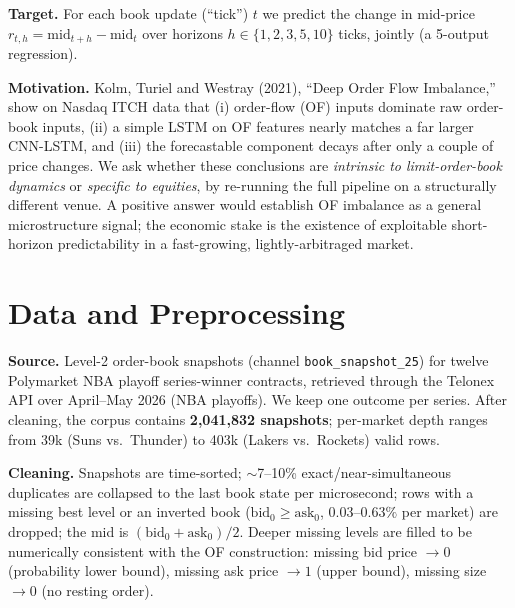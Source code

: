 \documentclass[10pt,twocolumn]{article}
\begin{document}
\textbf{Target.} For each book update (``tick'') $t$ we predict the change in
mid-price $r_{t,h}=\mathrm{mid}_{t+h}-\mathrm{mid}_t$ over horizons
$h\in\{1,2,3,5,10\}$ ticks, jointly (a 5-output regression).

\textbf{Motivation.} Kolm, Turiel and Westray (2021), ``Deep Order Flow
Imbalance,'' show on Nasdaq ITCH data that (i) order-flow (OF) inputs dominate raw
order-book inputs, (ii) a simple LSTM on OF features nearly matches a far larger
CNN-LSTM, and (iii) the forecastable component decays after only a couple of price
changes. We ask whether these conclusions are \emph{intrinsic to limit-order-book
dynamics} or \emph{specific to equities}, by re-running the full pipeline on a
structurally different venue. A positive answer would establish OF imbalance as a
general microstructure signal; the economic stake is the existence of exploitable
short-horizon predictability in a fast-growing, lightly-arbitraged market.

\section{Data and Preprocessing}

\textbf{Source.} Level-2 order-book snapshots (channel
\texttt{book\_snapshot\_25}) for twelve Polymarket NBA playoff series-winner
contracts, retrieved through the Telonex API over April--May 2026 (NBA playoffs).
We keep one outcome per series. After cleaning, the corpus contains
\textbf{2{,}041{,}832 snapshots}; per-market depth ranges from 39k (Suns vs.\
Thunder) to 403k (Lakers vs.\ Rockets) valid rows.

\textbf{Cleaning.} Snapshots are time-sorted; $\sim$7--10\% exact/near-simultaneous
duplicates are collapsed to the last book state per microsecond; rows with a
missing best level or an inverted book ($\mathrm{bid}_0\!\ge\!\mathrm{ask}_0$,
$0.03$--$0.63\%$ per market) are dropped; the mid is
$(\mathrm{bid}_0+\mathrm{ask}_0)/2$. Deeper missing levels are filled to be
numerically consistent with the OF construction: missing bid price $\to 0$
(probability lower bound), missing ask price $\to 1$ (upper bound), missing size
$\to 0$ (no resting order).
\end{document}
